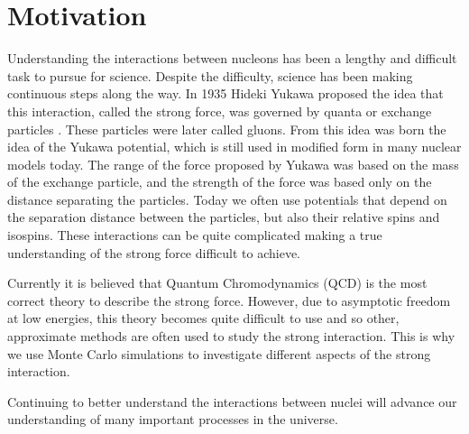 \section{Motivation}
Understanding the interactions between nucleons has been a lengthy and difficult task to pursue for science. Despite the difficulty, science has been making continuous steps along the way. In 1935 Hideki Yukawa proposed the idea that this interaction, called the strong force, was governed by quanta or exchange particles \cite{yukawa1935}. These particles were later called gluons. From this idea was born the idea of the Yukawa potential, which is still used in modified form in many nuclear models today. The range of the force proposed by Yukawa was based on the mass of the exchange particle, and the strength of the force was based only on the distance separating the particles. Today we often use potentials that depend on the separation distance between the particles, but also their relative spins and isospins. These interactions can be quite complicated making a true understanding of the strong force difficult to achieve.

Currently it is believed that Quantum Chromodynamics (QCD) is the most correct theory to describe the strong force. However, due to asymptotic freedom at low energies, this theory becomes quite difficult to use and so other, approximate methods are often used to study the strong interaction. This is why we use Monte Carlo simulations to investigate different aspects of the strong interaction.

Continuing to better understand the interactions between nuclei will advance our understanding of many important processes in the universe.
